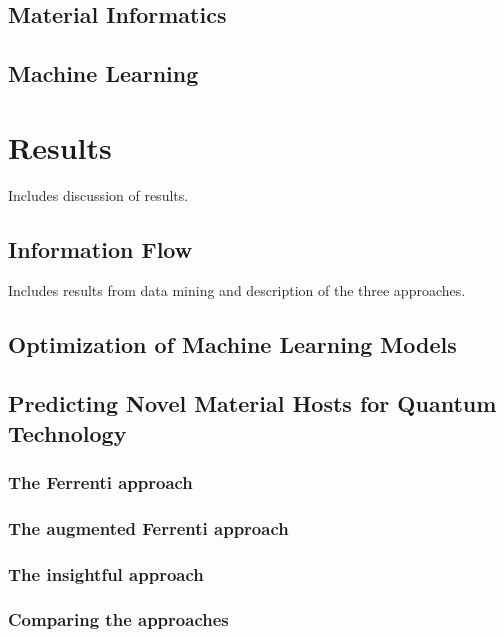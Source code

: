 \documentclass[superscriptaddress,unsortedaddress,
 amsmath,amssymb,
 aps,
]{revtex4-2}
\begin{document}
\subsection*{Material Informatics} %

\subsection*{Machine Learning} %

\section*{Results}
Includes discussion of results.  

\subsection*{Information Flow}  %
Includes results from data mining and description of the three approaches. 

\subsection*{Optimization of Machine Learning Models} %

\subsection*{Predicting Novel Material Hosts for Quantum Technology} %
\subsubsection*{The Ferrenti approach} 
\subsubsection*{The augmented Ferrenti approach} 
\subsubsection*{The insightful approach} 
\subsubsection*{Comparing the approaches}  
\end{document}

